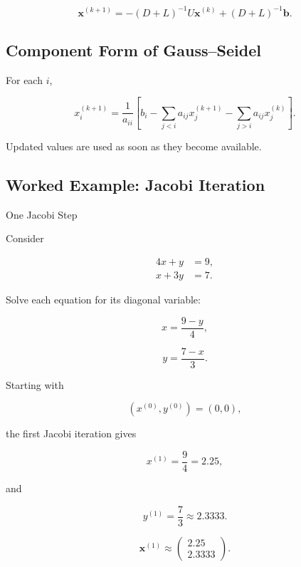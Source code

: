 \[
\boxed{
\mathbf{x}^{(k+1)}
=
-(D+L)^{-1}
U\mathbf{x}^{(k)}
+
(D+L)^{-1}\mathbf{b}.
}
\]

\subsection{Component Form of Gauss--Seidel}
\label{subsec:gauss-seidel-component}

For each \(i\),

\[
\boxed{
x_i^{(k+1)}
=
\frac1{a_{ii}}
\left[
b_i
-
\sum_{j<i}
a_{ij}
x_j^{(k+1)}
-
\sum_{j>i}
a_{ij}
x_j^{(k)}
\right].
}
\]

Updated values are used as soon as they become available.

\subsection{Worked Example: Jacobi Iteration}
\label{subsec:worked-jacobi}

\begin{workedexamplebox}{One Jacobi Step}

Consider

\[
\begin{aligned}
4x+y&=9,\\
x+3y&=7.
\end{aligned}
\]

Solve each equation for its diagonal variable:

\[
x
=
\frac{9-y}{4},
\]

\[
y
=
\frac{7-x}{3}.
\]

Starting with

\[
(x^{(0)},y^{(0)})
=
(0,0),
\]

the first Jacobi iteration gives

\[
x^{(1)}
=
\frac94
=
2.25,
\]

and

\[
y^{(1)}
=
\frac73
\approx2.3333.
\]

\begin{answerbox}
\[
\boxed{
\mathbf{x}^{(1)}
\approx
\begin{pmatrix}
2.25\\
2.3333
\end{pmatrix}.
}
\]
\end{answerbox}

\end{workedexamplebox}

